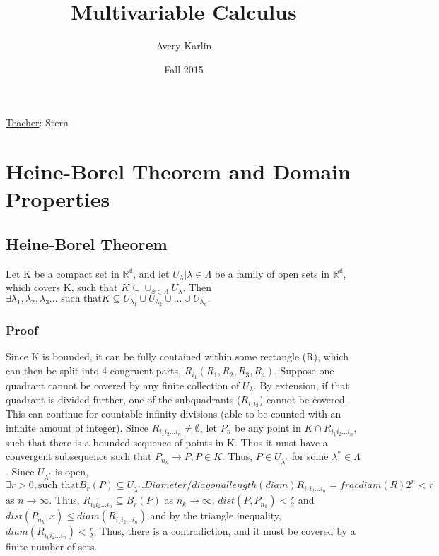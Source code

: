\documentclass[11 pt, twoside]{article}
\begin{document}
\title{Multivariable Calculus}
\author{Avery Karlin}
\date{Fall 2015}

\maketitle
\newpage
\tableofcontents
\vspace{11pt}
\noindent
\underline{Teacher}: Stern
\newpage


\section{Heine-Borel Theorem and Domain Properties}

\subsection{Heine-Borel Theorem}
Let K be a compact set in $\mathbb{R^d}$, and let ${U_\lambda | \lambda \in \Lambda}$ be a family of open sets in $\mathbb{R^d}$, which covers K, such that $K \subseteq \cup_{x \in \Lambda}U_\lambda$. Then $\exists \lambda_1, \lambda_2, \lambda_3 \text{... such that} K \subseteq U_{\lambda_1} \cup U_{\lambda_2} \cup \text{...} \cup U_{\lambda_n}.$

\subsubsection{Proof}
Since K is bounded, it can be fully contained within some rectangle (R), which can then be split into 4 congruent parts, $R_{i_1} (R_1, R_2, R_3, R_4)$. Suppose one quadrant cannot be covered by any finite collection of $U_\lambda$. By extension, if that quadrant is divided further, one of the subquadrants ($R_{i_1i_2}$) cannot be covered. This can continue for countable infinity divisions (able to be counted with an infinite amount of integer). Since $R_{i_1i_2...i_n} \neq \emptyset$, let $P_n$ be any point in $K \cap R_{i_1i_2...i_n}$, such that there is a bounded sequence of points in K. Thus it must have a convergent subsequence such that $P_{n_k} \to P, P \in K$. Thus, $P \in U_{\lambda^*}$ for some $\lambda^* \in \Lambda$. Since $U_{\lambda^*}$ is open, $\exists r > 0, \text{such that} B_r(P) \subseteq U_{\lambda^*}. Diameter/diagonal length (diam) R_{i_1i_2...i_n} = frac{diam(R)}{2^n} < r$ as $n \to \infty$. Thus, $R_{i_1i_2...i_n} \subseteq B_r(P)$ as $n_k \to \infty$. $dist(P, P_{n_k}) < \frac{r}{2}$ and $dist(P_{n_k}, x) \leq diam(R_{i_1i_2...i_n})$ and by the triangle inequality, $diam(R_{i_1i_2...i_n}) < \frac{r}{2}$. Thus, there is a contradiction, and it must be covered by a finite number of sets.
\end{document}
